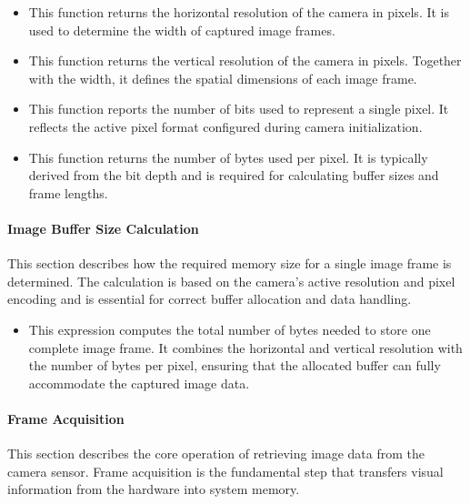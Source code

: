 \begin{itemize}
	\item {} 
	
	This function returns the horizontal resolution of the camera in pixels. It is used to determine the width of captured image frames.
	
	\item {} 
	
	This function returns the vertical resolution of the camera in pixels. Together with the width, it defines the spatial dimensions of each image frame.
	
	\item {} 
	
	This function reports the number of bits used to represent a single pixel. It reflects the active pixel format configured during camera initialization.
	
	\item {} 
	
	This function returns the number of bytes used per pixel. It is typically derived from the bit depth and is required for calculating buffer sizes and frame lengths.
\end{itemize}

\paragraph{Image Buffer Size Calculation}
This section describes how the required memory size for a single image frame is determined. The calculation is based on the camera’s active resolution and pixel encoding and is essential for correct buffer allocation and data handling.

\begin{itemize}
	\item {} 
	
	This expression computes the total number of bytes needed to store one complete image frame. It combines the horizontal and vertical resolution with the number of bytes per pixel, ensuring that the allocated buffer can fully accommodate the captured image data.
\end{itemize}


\paragraph{Frame Acquisition}
This section describes the core operation of retrieving image data from the camera sensor. Frame acquisition is the fundamental step that transfers visual information from the hardware into system memory.

